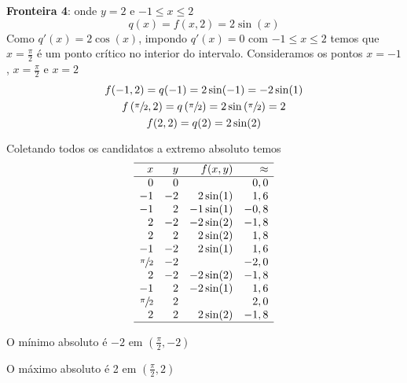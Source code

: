 \documentclass[a4paper,12pt,fleqn]{article}
\begin{document}
\begin{answer}
  \textbf{Fronteira 4}: onde \(y=2\) e  \(-1 \le x \le 2\)
  \[
    q(x)
    = f(x, 2)
    = 2\sin(x)
  \]
  Como \(q'(x) = 2\cos(x)\), impondo \(q'(x)=0\) com \(-1 \le x \le 2\)
  temos que \(x=\frac{\pi}{2}\) é um ponto crítico no interior do intervalo.
  Consideramos os pontos \(x=-1\), \(x=\frac{\pi}{2}\) e \(x=2\)
  \begin{gather*}
    f(-1, 2)
    = q(-1)
    = 2\sin(-1)
    = -2\sin(1)
    \\
    f\left(\sfrac{\pi}{2}, 2\right)
    = q\left(\sfrac{\pi}{2}\right)
    = 2 \sin\left(\sfrac{\pi}{2}\right)
    = 2
    \\
    f(2, 2)
    = q(2)
    = 2\sin(2)
  \end{gather*}

  Coletando todos os candidatos a extremo absoluto temos
  \[
    \begin{array}{rrrr}
      \hline
       x             &  y  &  f(x, y)  & \approx      \\ \hline
       0             &  0  &           &   0,0 \\
      -1             & -2  &  2\sin(1) &   1,6 \\
      -1             &  2  & -1\sin(1) &  -0,8 \\
       2             & -2  & -2\sin(2) &  -1,8 \\
       2             &  2  &  2\sin(2) &   1,8 \\
      -1             & -2  &  2\sin(1) &   1,6 \\
      \sfrac{\pi}{2} & -2  &           &  -2,0 \\
       2             & -2  & -2\sin(2) &  -1,8 \\
      -1             &  2  & -2\sin(1) &   1,6 \\
      \sfrac{\pi}{2} &  2  &           &   2,0 \\
       2             &  2  &  2\sin(2) &  -1,8 \\ \hline
    \end{array}
  \]

  O mínimo absoluto é $-2$ em \(\left(\frac{\pi}{2}, -2\right)\)

  O máximo absoluto é 2 em \(\left(\frac{\pi}{2}, 2\right)\)
\end{answer}

\end{document}
